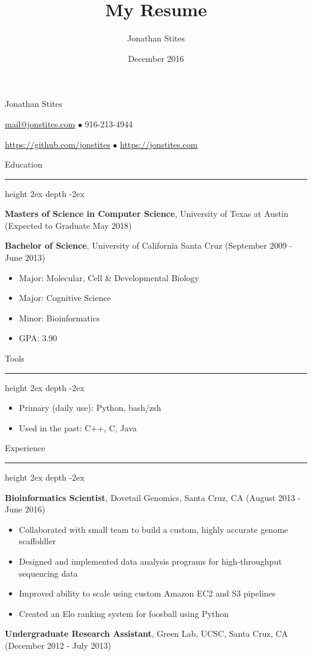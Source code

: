 \documentclass[12]{article}
\title{My Resume}
\author{Jonathan Stites}
\date{December 2016}
\newcommand\sectionline{\par\leavevmode\leaders\hrule height 2ex depth \dimexpr0.4pt-2ex\hfill\kern0pt\par}
\begin{document}
\begin{center}
{\LARGE Jonathan Stites}

{\href{mailto:mail+resume@jonstites.com}{mail@jonstites.com}}
$\bullet$
916-213-4944

{\href{https://github.com/jonstites}{https://github.com/jonstites}}
$\bullet$
{\href{https://jonstites.com}{https://jonstites.com}}
\end{center}

{\Large Education}\sectionline

\textbf{Masters of Science in Computer Science}, University of Texas at Austin (Expected to Graduate May 2018)

\vspace{\baselineskip}

\textbf{Bachelor of Science}, University of California Santa Cruz (September 2009 - June 2013)

\begin{itemize}
\item Major: Molecular, Cell \& Developmental Biology
\item Major: Cognitive Science
\item Minor: Bioinformatics
\item GPA: 3.90
\end{itemize}

{\Large Tools}\sectionline

\begin{itemize}
\item Primary (daily use): Python, bash/zsh
\item Used in the past: C++, C, Java
\end{itemize}

{\Large Experience}\sectionline

\textbf{Bioinformatics Scientist}, Dovetail Genomics, Santa Cruz, CA (August 2013 - June 2016)

\begin{itemize}
\item Collaborated with small team to build a custom, highly accurate genome scaffoldler
\item Designed and implemented data analysis programs for high-throughput sequencing data
\item Improved ability to scale using custom Amazon EC2 and S3 pipelines
\item Created an Elo ranking system for foosball using Python
\end{itemize}

\textbf{Undergraduate Research Assistant}, Green Lab, UCSC, Santa Cruz, CA (December 2012 - July 2013)
\end{document}
